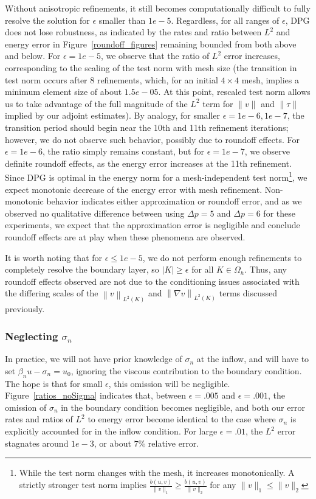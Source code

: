 \documentclass[11pt,onecolumn]{scrartcl}
\newcommand{\nor}[1]{\left\| #1 \right\|}
\newcommand{\Oh}{\Omega_h}
\newcommand{\grad}{\nabla}
\begin{document}
Without anisotropic refinements, it still becomes computationally difficult to fully resolve the solution for $\epsilon$ smaller than $1e-5$. Regardless, for all ranges of $\epsilon$, DPG does not lose robustness, as indicated by the rates and ratio between $L^2$ and energy error in Figure~\ref{roundoff_figures} remaining bounded from both above and below. For $\epsilon = 1e-5$, we observe that the ratio of $L^2$ error increases, corresponding to the scaling of the test norm with mesh size (the transition in test norm occurs after 8 refinements, which, for an initial $4\times 4$ mesh, implies a minimum element size of about $1.5e-05$. At this point, rescaled test norm allows us to take advantage of the full magnitude of the $L^2$ term for $\|v\|$ and $\|\tau\|$ implied by our adjoint estimates). By analogy, for smaller $\epsilon = 1e-6, 1e-7$, the transition period should begin near the 10th and 11th refinement iterations; however, we do not observe such behavior, possibly due to roundoff effects. 
For $\epsilon=1e-6$, the ratio simply remains constant, but for $\epsilon=1e-7$, we observe definite roundoff effects, as the energy error increases at the 11th refinement. Since DPG is optimal in the energy norm for a mesh-independent test norm\footnote{While the test norm changes with the mesh, it increases monotonically. A strictly stronger test norm implies $\frac{b(u,v)}{\|v\|_1} \geq \frac{b(u,v)}{\|v\|_2}$ for any $\|v\|_1 \leq \|v\|_2$}, we expect monotonic decrease of the energy error with mesh refinement. Non-monotonic behavior indicates either approximation or roundoff error, and as we observed no qualitative difference between using $\Delta p = 5$ and $\Delta p = 6$ for these experiments, we expect that the approximation error is negligible and conclude roundoff effects are at play when these phenomena are observed. 

It is worth noting that for $\epsilon \leq 1e-5$, we do not perform enough refinements to completely resolve the boundary layer, so $|K| \geq \epsilon$ for all $K\in \Oh$. Thus, any roundoff effects observed are not due to the conditioning issues associated with the differing scales of the $\nor{v}_{L^2(K)}$ and $\nor{\grad v}_{L^2(K)}$ terms discussed previously. 

\subsubsection{Neglecting $\sigma_n$}

In practice, we will not have prior knowledge of $\sigma_n$ at the inflow, and will have to set $\beta_n u - \sigma_n = u_0$, ignoring the viscous contribution to the boundary condition.  The hope is that for small $\epsilon$, this omission will be negligible. Figure~\ref{ratios_noSigma} indicates that, between $\epsilon = .005$ and $\epsilon = .001$, the omission of $\sigma_n$ in the boundary condition becomes negligible, and both our error rates and ratios of $L^2$ to energy error become identical to the case where $\sigma_n$ is explicitly accounted for in the inflow condition. For large $\epsilon = .01$, the $L^2$ error stagnates around $1e-3$, or about $7\%$ relative error. 
\end{document}

